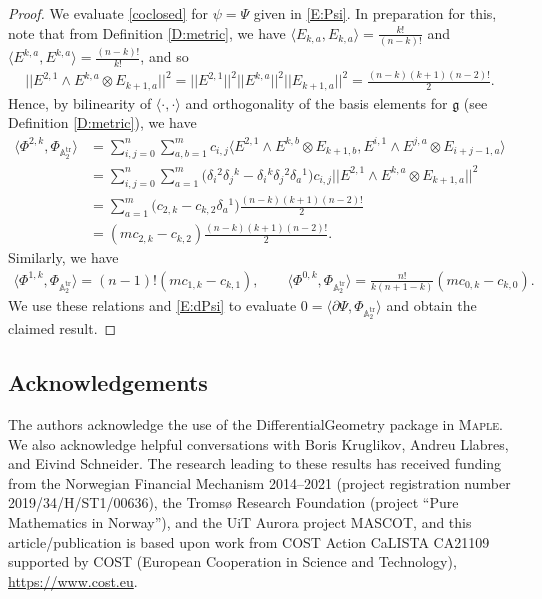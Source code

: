 \documentclass[pdftex]{sigma}%
\newcommand\tensor{\otimes}
\DeclareMathOperator{\tr}{tr}
\newcommand{\g}{\mathfrak{g}}
\newcommand\bbA{\mathbb{A}}
\numberwithin{equation}{section}
\begin{document}
\begin{proof}
We evaluate \eqref{coclosed} for $\psi = \Psi$ given in \eqref{E:Psi}. In preparation for this, note that from Definition \ref{D:metric}, we have $\langle E_{k,a}, E_{k,a} \rangle = \frac{k!}{(n-k)!}$ and $\langle E^{k,a}, E^{k,a} \rangle = \frac{(n-k)!}{k!}$, and so
\begin{align*}
 \big|\big|E^{2,1} \wedge E^{k,a} \tensor E_{k+1,a}\big|\big|^2 = \big|\big|E^{2,1}\big|\big|^2 \big|\big|E^{k,a}\big|\big|^2\big|\big|E_{k+1,a}\big|\big|^2 = \frac{(n-k)(k+1)(n-2)!}{2}.
\end{align*}
 Hence, by bilinearity of $\langle \cdot,\cdot \rangle$ and orthogonality of the basis elements for $\g$ (see Definition \ref{D:metric}), we have
\begin{align*}%
\big\langle \Phi^{2,k}, \Phi_{\bbA_2^{\tr}} \big\rangle
&= \sum_{i,j=0}^n\sum_{a,b=1}^m c_{i,j}\big\langle E^{2,1} \wedge E^{k,b} \tensor E_{k+1,b}, E^{i,1} \wedge E^{j,a} \tensor E_{i+j-1,a} \big\rangle\\
&= \sum_{i,j=0}^n \sum_{a=1}^m \bigl(\delta_i{}^2\delta_j{}^k - \delta_i{}^k \delta_j{}^2 \delta_a{}^1\bigr) c_{i,j} \big|\big|E^{2,1} \wedge E^{k,a}\tensor E_{k+1,a}\big|\big|^2\\
&= \sum_{a=1}^m \bigl(c_{2,k} - c_{k,2} \delta_a{}^1\bigr) \frac{(n-k)(k+1)(n-2)!}{2} \\
&= (mc_{2,k} - c_{k,2} ) \frac{(n-k)(k+1)(n-2)!}{2}.
\end{align*}
Similarly, we have
\begin{align*}
\big\langle \Phi^{1,k}, \Phi_{\bbA_2^{\tr}} \big\rangle = (n-1)!(mc_{1,k}-c_{k,1}), \qquad
\big\langle \Phi^{0,k}, \Phi_{\bbA_2^{\tr}} \big\rangle = \frac{n!}{k(n+1-k)}(mc_{0,k}-c_{k,0}).
\end{align*}
 We use these relations and \eqref{E:dPsi} to evaluate $0 = \langle\partial\Psi,\Phi_{\bbA_2^{\tr}} \rangle$ and obtain the claimed result.
 \end{proof}


\subsection*{Acknowledgements}

The authors acknowledge the use of the DifferentialGeometry package in \textsc{Maple}. We also acknowledge helpful conversations with Boris Kruglikov, Andreu Llabres, and Eivind Schneider. The research leading to these results has received funding from the Norwegian Financial Mechanism 2014--2021 (project registration number 2019/34/H/ST1/00636), the Troms\o{} Research Foundation (project ``Pure Mathematics in Norway''), and the UiT Aurora project MASCOT, and this article/publication is based upon work from COST Action CaLISTA CA21109 supported by COST (European Cooperation in Science and Technology), \url{https://www.cost.eu}.
\end{document}
